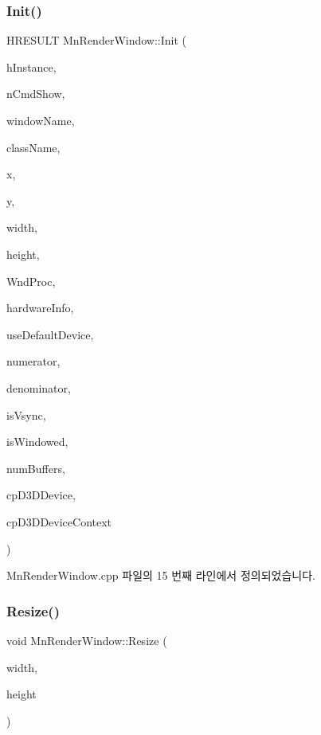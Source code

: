 \subsubsection{\texorpdfstring{Init()}{Init()}}
{\footnotesize\ttfamily H\+R\+E\+S\+U\+LT Mn\+Render\+Window\+::\+Init (\begin{DoxyParamCaption}\item[{H\+I\+N\+S\+T\+A\+N\+CE}]{h\+Instance,  }\item[{int}]{n\+Cmd\+Show,  }\item[{std\+::wstring}]{window\+Name,  }\item[{std\+::wstring}]{class\+Name,  }\item[{float}]{x,  }\item[{float}]{y,  }\item[{float}]{width,  }\item[{float}]{height,  }\item[{W\+N\+D\+P\+R\+OC}]{Wnd\+Proc,  }\item[{const \hyperlink{class_m_n_l_1_1_mn_hardware}{Mn\+Hardware} \&}]{hardware\+Info,  }\item[{bool}]{use\+Default\+Device,  }\item[{U\+I\+NT}]{numerator,  }\item[{U\+I\+NT}]{denominator,  }\item[{bool}]{is\+Vsync,  }\item[{bool}]{is\+Windowed,  }\item[{U\+I\+NT}]{num\+Buffers,  }\item[{const \hyperlink{namespace_m_n_l_a1eec210db8f309a4a9ac0d9658784c31}{C\+P\+D3\+D\+Device}}]{cp\+D3\+D\+Device,  }\item[{const \hyperlink{namespace_m_n_l_aab3aabb6c9360e44ddc8b0bb563c2107}{C\+P\+D3\+D\+Device\+Context}}]{cp\+D3\+D\+Device\+Context }\end{DoxyParamCaption})}



Mn\+Render\+Window.\+cpp 파일의 15 번째 라인에서 정의되었습니다.

\mbox{\label{class_m_n_l_1_1_mn_render_window_a795840e10508a5c98aff467314cac40f}} 
\subsubsection{\texorpdfstring{Resize()}{Resize()}}
{\footnotesize\ttfamily void Mn\+Render\+Window\+::\+Resize (\begin{DoxyParamCaption}\item[{U\+I\+NT}]{width,  }\item[{U\+I\+NT}]{height }\end{DoxyParamCaption})}



